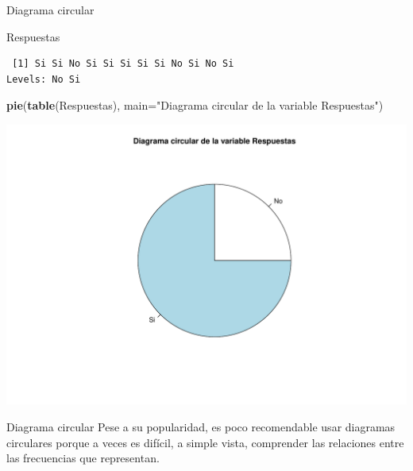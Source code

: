 \documentclass[
  ignorenonframetext,
]{beamer}
\newenvironment{Shaded}{\begin{snugshade}}{\end{snugshade}}
\newcommand{\AttributeTok}[1]{\textcolor[rgb]{0.13,0.29,0.53}{#1}}
\newcommand{\FunctionTok}[1]{\textcolor[rgb]{0.13,0.29,0.53}{\textbf{#1}}}
\newcommand{\NormalTok}[1]{#1}
\newcommand{\StringTok}[1]{\textcolor[rgb]{0.31,0.60,0.02}{#1}}
\begin{document}
\begin{frame}[fragile]{Diagrama circular}
\label{diagrama-circular-2}
\begin{Shaded}
\begin{Highlighting}[]
\NormalTok{Respuestas}
\end{Highlighting}
\end{Shaded}

\begin{verbatim}
 [1] Si Si No Si Si Si Si Si No Si No Si
Levels: No Si
\end{verbatim}

\begin{Shaded}
\begin{Highlighting}[]
\FunctionTok{pie}\NormalTok{(}\FunctionTok{table}\NormalTok{(Respuestas), }\AttributeTok{main=}\StringTok{"Diagrama circular de la variable Respuestas"}\NormalTok{)}
\end{Highlighting}
\end{Shaded}

\includegraphics{R_base_files/figure-beamer/unnamed-chunk-93-1.pdf}
\end{frame}

\begin{frame}{Diagrama circular}
\label{diagrama-circular-3}
Pese a su popularidad, es poco recomendable usar diagramas circulares
porque a veces es difícil, a simple vista, comprender las relaciones
entre las frecuencias que representan.
\end{frame}
\end{document}
